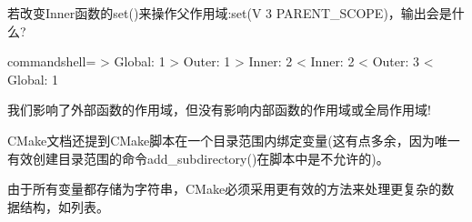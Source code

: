 若改变Inner函数的set()来操作父作用域:set(V 3 PARENT\_SCOPE)，输出会是什么?

\begin{tcblisting}{commandshell={}}
> Global: 1
  > Outer: 1
    > Inner: 2
    < Inner: 2
  < Outer: 3
< Global: 1
\end{tcblisting}

我们影响了外部函数的作用域，但没有影响内部函数的作用域或全局作用域!

CMake文档还提到CMake脚本在一个目录范围内绑定变量(这有点多余，因为唯一有效创建目录范围的命令add\_subdirectory()在脚本中是不允许的)。

由于所有变量都存储为字符串，CMake必须采用更有效的方法来处理更复杂的数据结构，如列表。




























